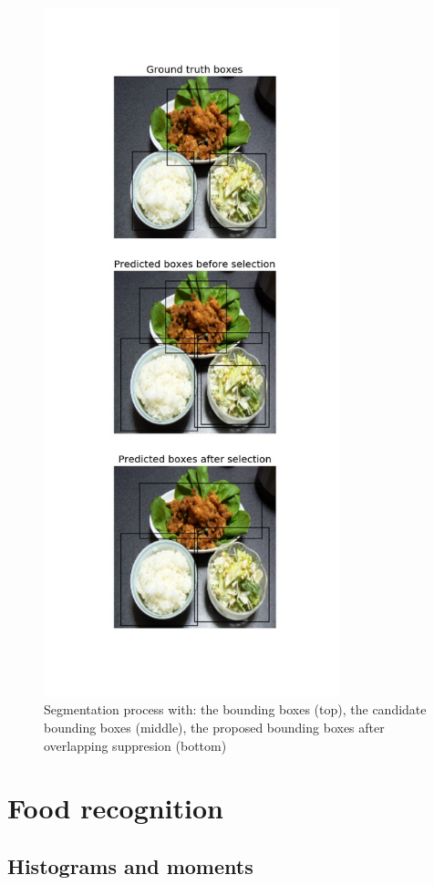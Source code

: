 \begin{figure}
    \centering
    \includegraphics[height=20cm]{img/seg_97.jpg}
    \caption[Segmentation result]{Segmentation process with: the bounding boxes (top), the candidate bounding boxes (middle), the proposed bounding boxes after overlapping suppresion (bottom)}
    \label{fig:seg_97}
\end{figure}

\section{Food recognition}
\subsection{Histograms and moments}

